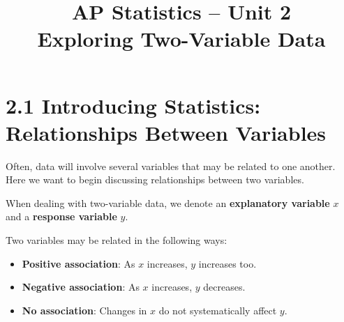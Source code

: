 



\newenvironment{ideaBox}{\begin{center}\begin{tikzpicture}
\node[fill=light-blue, draw=blue, thick, rounded corners, inner sep=10pt, text width=0.95\textwidth] \bgroup\footnotesize}{\egroup;\end{tikzpicture}\end{center}}

\newenvironment{warningBox}{\begin{center}\begin{tikzpicture}
\node[fill=light-yellow, draw=orange, thick, rounded corners, inner sep=10pt, text width=0.95\textwidth] \bgroup\footnotesize}{\egroup;\end{tikzpicture}\end{center}}


\pagestyle{fancy}
\fancyhf{}
\cfoot{\thepage}

\title{\vspace{-2cm}AP Statistics -- Unit 2\\Exploring Two-Variable Data}
\date{}




\maketitle

\section*{2.1 Introducing Statistics: Relationships Between Variables}
Often, data will involve several variables that may be related to one another. Here we want to begin discussing relationships between two variables. 

\begin{tcolorbox}[title=Key Terms, colback=blue!5!white, colframe=blue!75!black, breakable]
When dealing with two-variable data, we denote an \textbf{explanatory variable} $x$ and a \textbf{response variable} $y$.
\end{tcolorbox}
\par\medskip

\begin{tcolorbox}[title=Key Terms, colback=blue!5!white, colframe=blue!75!black, breakable]
Two variables may be related in the following ways:
\begin{itemize}
    \item \textbf{Positive association}: As $x$ increases, $y$ increases too.
    \item \textbf{Negative association}: As $x$ increases, $y$ decreases.
    \item \textbf{No association}: Changes in $x$ do not systematically affect $y$.
\end{itemize}
\end{tcolorbox}

